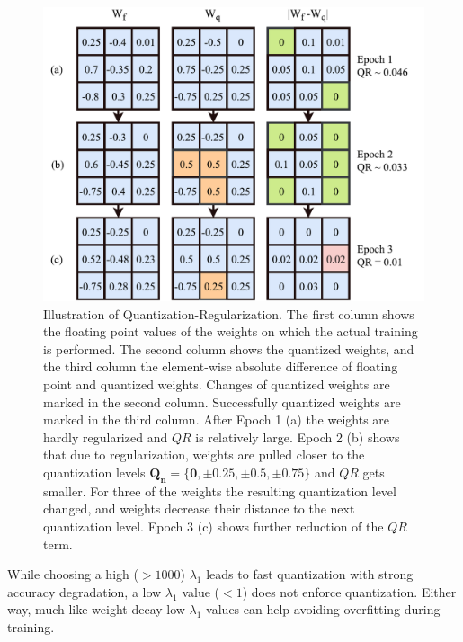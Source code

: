 \begin{figure}[ht!]
\includegraphics[width=\columnwidth]{img/weightreg.pdf}
\caption{Illustration of Quantization-Regularization. The first column shows the floating point values of the weights on which the actual training is performed. The second column shows the quantized weights, and the third column the element-wise absolute difference of floating point and quantized weights. Changes of quantized weights are marked in the second column.  Successfully quantized weights are marked in the third column. After Epoch 1 (a) the weights are hardly regularized and $QR$ is relatively large. Epoch 2 (b) shows that due to regularization, weights are pulled closer to the quantization levels $\mathbf{Q_n=\{0,\pm 0.25, \pm 0.5, \pm 0.75\}}$ and $QR$ gets smaller. For three of the weights the resulting quantization level changed, and weights decrease their distance to the next quantization level. Epoch 3 (c) shows further reduction of the $QR$ term.}\label{fig:weightreg}
\end{figure}

While choosing a high ($>1000$) $\lambda_1$ leads to fast quantization with strong accuracy degradation, a low $\lambda_1$ value ($<1$) does not enforce quantization. Either way, much like weight decay low $\lambda_1$ values can help avoiding overfitting during training.

